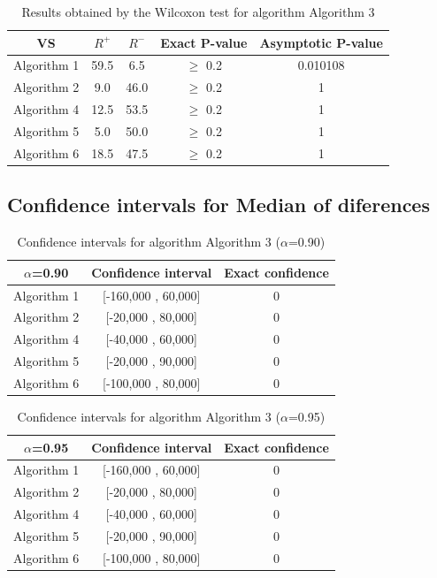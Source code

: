 \documentclass[a4paper,10pt]{article}
\begin{document}
\begin{table}[!htp]
\centering\small
\begin{tabular}{
|c|c|c|c|c|}
\hline
 VS & $R^{+}$ & $R^{-}$ & Exact P-value & Asymptotic P-value \\ \hline 
Algorithm 1 & 59.5 & 6.5 & $\geq$ 0.2 & 0.010108\\ \hline 
Algorithm 2 & 9.0 & 46.0 & $\geq$ 0.2 & 1\\ \hline 
Algorithm 4 & 12.5 & 53.5 & $\geq$ 0.2 & 1\\ \hline 
Algorithm 5 & 5.0 & 50.0 & $\geq$ 0.2 & 1\\ \hline 
Algorithm 6 & 18.5 & 47.5 & $\geq$ 0.2 & 1\\ \hline 

\end{tabular}
\caption{Results obtained by the Wilcoxon test for algorithm Algorithm 3}
\end{table}

\subsection{Confidence intervals for Median of diferences}

\begin{table}[!htp]
\centering\small
\begin{tabular}{
|c|c|c|}
\hline
 $\alpha$=0.90 & Confidence interval & Exact confidence \\ \hline 
Algorithm 1 & [-160,000 , 60,000] & 0\\ \hline 
Algorithm 2 & [-20,000 , 80,000] & 0\\ \hline 
Algorithm 4 & [-40,000 , 60,000] & 0\\ \hline 
Algorithm 5 & [-20,000 , 90,000] & 0\\ \hline 
Algorithm 6 & [-100,000 , 80,000] & 0\\ \hline 

\end{tabular}
\caption{Confidence intervals for algorithm Algorithm 3 ($\alpha$=0.90)}
\end{table}
\begin{table}[!htp]
\centering\small
\begin{tabular}{
|c|c|c|}
\hline
 $\alpha$=0.95 & Confidence interval & Exact confidence \\ \hline 
Algorithm 1 & [-160,000 , 60,000] & 0\\ \hline 
Algorithm 2 & [-20,000 , 80,000] & 0\\ \hline 
Algorithm 4 & [-40,000 , 60,000] & 0\\ \hline 
Algorithm 5 & [-20,000 , 90,000] & 0\\ \hline 
Algorithm 6 & [-100,000 , 80,000] & 0\\ \hline 

\end{tabular}
\caption{Confidence intervals for algorithm Algorithm 3 ($\alpha$=0.95)}
\end{table}
\end{document}
